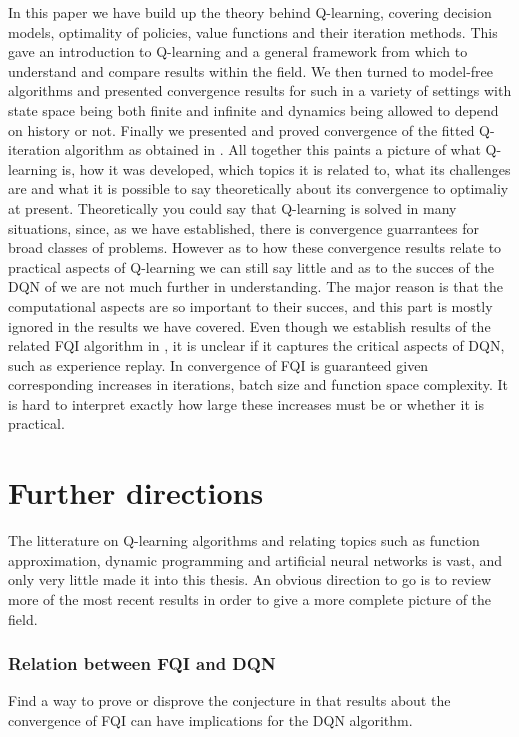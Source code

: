 In this paper we have build up the theory behind Q-learning,
covering decision models, optimality of policies,
value functions and their iteration methods.
This gave an introduction to Q-learning 
and a general framework from which to understand
and compare results within the field.
We then turned to model-free algorithms 
and presented convergence results for such in a variety
of settings with state space being both finite and infinite and
dynamics being allowed to depend on history or not.
Finally we presented and proved convergence of the fitted Q-iteration
algorithm as obtained in .
All together this paints a picture of what Q-learning is,
how it was developed, which topics it is related to,
what its challenges are and what it is possible to
say theoretically about its convergence to optimaliy at present.
Theoretically you could say that Q-learning is solved in many situations,
since, as we have established,
there is convergence guarrantees for broad classes of problems.
However as to how these convergence results relate to practical aspects of
Q-learning we can still say little and as to the succes of the DQN of
 we are not much further in understanding.
The major reason is that the computational aspects are so important to their 
succes, and this part is mostly ignored in the results we have covered.
Even though we establish results of the related FQI algorithm in ,
it is unclear if it captures the critical aspects of DQN,
such as experience replay.
In  convergence of FQI is guaranteed given corresponding
increases in iterations, batch size and function space complexity.
It is hard to interpret exactly how large these increases must be
or whether it is practical.

\section{Further directions}

The litterature on Q-learning algorithms and relating topics such as 
function approximation, dynamic programming and artificial neural networks
is vast, and only very little made it into this thesis. 
An obvious direction to go is to review more of the most recent results
in order to give a more complete picture of the field.

\subsubsection{Relation between FQI and DQN}
Find a way to prove or disprove the conjecture in  that
results about the convergence of FQI can have implications for the 
DQN algorithm.

